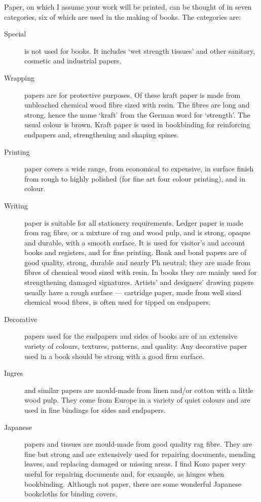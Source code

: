 \documentclass[10pt,letterpaper,extrafontsizes]{memoir}
\begin{document}
    Paper, on which I assume your work will be printed, can be thought of
in seven categories, six of which are used in the making of books. The 
categories are: 
\begin{description}
\item[Special] is not used for books. 
It includes `wet strength tissues' and
other sanitary, cosmetic and industrial papers.
\item[Wrapping] papers are for protective purposes. 
Of these kraft paper is made from
unbleached chemical wood fibre sized with resin. The fibres are long and 
strong, hence the name `kraft' from the German word for `strength'. The usual
colour is brown. Kraft paper is used in bookbinding for reinforcing endpapers
and, strengthening and shaping spines.
\item[Printing] paper covers a wide range, 
from economical to expensive,
in surface finish from rough to highly polished (for fine art four colour
printing), and in colour.
\item[Writing] paper is suitable for all stationery 
requirements. Ledger
paper is made from rag fibre, or a mixture of rag and wood pulp, 
and is strong, opaque and durable, with a smooth
surface. It is used for visitor's and account books and registers, and for
fine printing. Bank and bond papers are of good quality, strong, durable 
and nearly Ph neutral; they are made from fibres of chemical wood
sized with resin. In books they are mainly used for strengthening damaged
signatures. Artists' and designers' drawing papers usually have a rough 
surface --- cartridge paper, made from well sized chemical wood fibres, 
is often used for tipped on endpapers.
\item[Decorative] papers used for the endpapers 
and sides of books are 
of an extensive variety of colours, textures, patterns, and quality. Any
decorative paper used in a book should be strong with a good firm surface.
\item[Ingres] and similar papers are mould-made 
from linen and/or cotton 
with a little
wood pulp. They come from Europe in a variety of quiet colours and are 
used in fine bindings for sides and endpapers.
\item[Japanese] papers and tissues are mould-made 
from good quality rag fibre.
They are fine but strong and are extensively used for repairing documents,
mending leaves, and replacing damaged or missing areas. I find 
Kozo paper very useful for repairing documents and, for 
example, as hinges when bookbinding. Although not paper, there are some 
wonderful Japanese bookcloths for binding covers.
\end{description}
\end{document}
